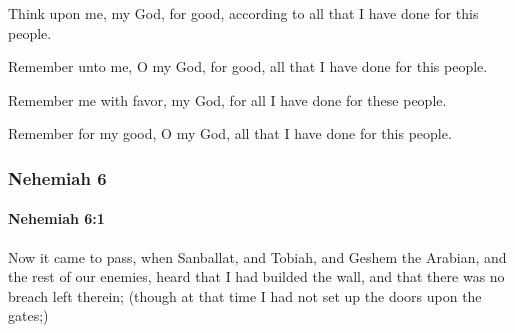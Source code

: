 			Think upon me, my God, for good, according to all that I have done for this people.

			\begin{versebox}
					\item[BHS] 
					\item[LXX] 
					\item[ASV] Remember unto me, O my God, for good, all that I have done for this people.
					\item[NIV] Remember me with favor, my God, for all I have done for these people.
					\item[NRSV] Remember for my good, O my God, all that I have done for this people.
			\end{versebox}
	\subsubsection{Nehemiah 6} %
		\label{NEHEMIAH-6}

		\paragraph{Nehemiah 6:1} %
			\label{NEHEMIAH-6-1}

			Now it came to pass, when Sanballat, and Tobiah, and Geshem the Arabian, and the rest of our enemies, heard that I had builded the wall, and that there was no breach left therein; (though at that time I had not set up the doors upon the gates;)

